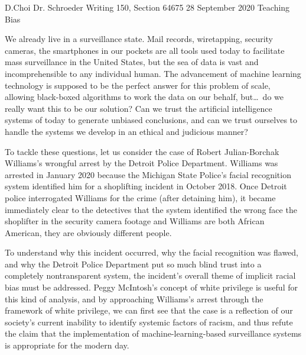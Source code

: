 \documentclass[12pt, letterpaper]{article}
\newcommand{\comment}[1]{}
\begin{document}
\begin{mla}
	{D.}{Choi}
	{Dr. Schroeder}
	{Writing 150, Section 64675}
	{28 September 2020}
	{Teaching Bias}


\comment{
The technology of the modern day is brilliant and terrifying. The tools
available to humanity now can have consequences on a previously unimaginable
scale\textemdash{we} can power the world with electricity, and in the process
destroy the ecosphere. We can inquire into the particle nature of the
universe, and use that knowledge to create mass-murder weapons. We can try to
teach artificial intelligence to detect and predict criminal activity, and
inadvertently establish an impenetrable surveillance state.
}

We already live in a surveillance state. Mail records, wiretapping, security
cameras, the smartphones in our pockets are all tools used
today to facilitate mass surveillance in the United States, but the sea of
data is vast and incomprehensible to any individual human. The advancement of
machine learning technology is supposed to be the perfect answer for this
problem of scale, allowing black-boxed algorithms to work the data on our
behalf, but\ldots\ do we really want this to be our solution? Can we trust
the artificial intelligence systems of today to generate unbiased conclusions,
and can we trust ourselves to handle the systems we develop in an ethical
and judicious manner?

To tackle these questions, let us consider the case of
Robert Julian-Borchak Williams's wrongful arrest by the Detroit Police
Department. Williams was arrested in January 2020 because the Michigan State
Police's facial recognition system identified him for a shoplifting incident
in October 2018. Once Detroit police interrogated Williams for the crime
(after detaining him), it became immediately clear to the detectives that the
system identified the wrong face the shoplifter in the
security camera footage and Williams are both African American, they are
obviously different people.

To understand why this incident occurred, why the facial recognition was
flawed, and why the Detroit Police Department put so much blind trust into a
completely nontransparent system, the incident's overall theme of implicit
racial bias must be addressed. Peggy McIntosh's concept of white privilege is
useful for this kind of analysis, and by approaching Williams's arrest through
the framework of white privilege, we can first see that the case is a
reflection of our society's current inability to identify systemic factors of
racism, and thus refute the claim that the implementation of
machine-learning-based surveillance systems is appropriate for the modern day.


\end{mla}
\end{document}
